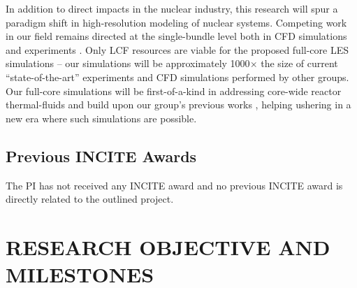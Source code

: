 In addition to direct impacts in the nuclear industry, this research will spur
a paradigm shift in high-resolution modeling of nuclear systems. Competing work
in our field remains directed at the single-bundle level both in CFD
simulations \cite{wang2020,fanning,wang2020b,Boyd2016} and experiments
\cite{Nguyen2017,Bhowmik2021,goth,song_2020,martin2020}.
Only LCF resources are viable for the proposed full-core LES simulations
-- our simulations will be approximately 1000\(\times\) the size of current
``state-of-the-art'' experiments and CFD simulations performed by other groups.
Our full-core simulations will be first-of-a-kind in addressing core-wide reactor thermal-fluids and build upon
our group's previous works \cite{Fang2021}, helping ushering in a new era where such simulations are possible.




\vspace{-.25in}
\subsection{Previous INCITE Awards}
\vspace{-.2in}

The PI has not received any INCITE award and no previous INCITE award is directly related to the outlined project.

\vspace{-.25in}
\section{RESEARCH OBJECTIVE AND MILESTONES} %
\vspace{-.2in}


